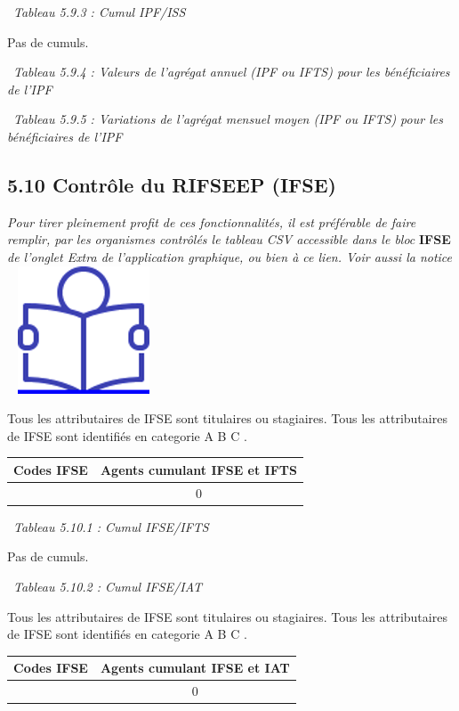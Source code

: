 ~\emph{Tableau 5.9.3 : Cumul IPF/ISS}

Pas de cumuls.

~\emph{Tableau 5.9.4 : Valeurs de l'agrégat annuel (IPF ou IFTS) pour
les bénéficiaires de l'IPF}

~\emph{Tableau 5.9.5 : Variations de l'agrégat mensuel moyen (IPF ou
IFTS) pour les bénéficiaires de l'IPF}

\hypertarget{controle-du-rifseep-ifse}{%
\subsection{5.10 Contrôle du RIFSEEP
(IFSE)}\label{controle-du-rifseep-ifse}}

\emph{Pour tirer pleinement profit de ces fonctionnalités, il est
préférable de faire remplir, par les organismes contrôlés le tableau CSV
accessible dans le bloc} \textbf{IFSE} \emph{de l'onglet Extra de
l'application graphique, ou bien à ce lien. Voir aussi la notice} ~
\href{../Docs/Notices/fiche_tableau_ifse.odt}{\includegraphics{icones/Notice.png}}

Tous les attributaires de IFSE sont titulaires ou stagiaires. Tous les
attributaires de IFSE sont identifiés en categorie A B C .

\begin{longtable}[]{@{}cc@{}}
\toprule
Codes IFSE & Agents cumulant IFSE et IFTS\tabularnewline
\midrule
\endhead
& 0\tabularnewline
\bottomrule
\end{longtable}

~\emph{Tableau 5.10.1 : Cumul IFSE/IFTS}

Pas de cumuls.

~\emph{Tableau 5.10.2 : Cumul IFSE/IAT}

Tous les attributaires de IFSE sont titulaires ou stagiaires. Tous les
attributaires de IFSE sont identifiés en categorie A B C .

\begin{longtable}[]{@{}cc@{}}
\toprule
Codes IFSE & Agents cumulant IFSE et IAT\tabularnewline
\midrule
\endhead
& 0\tabularnewline
\bottomrule
\end{longtable}

